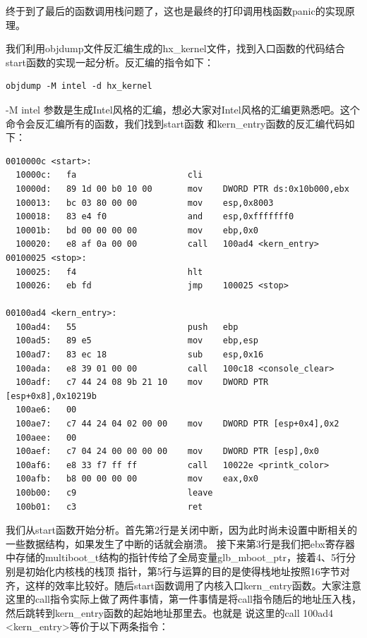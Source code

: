 \par 终于到了最后的函数调用栈问题了，这也是最终的打印调用栈函数panic的实现原理。

\par 我们利用objdump文件反汇编生成的hx\_kernel文件，找到入口函数的代码结合start函数的实现一起分析。反汇编的指令如下：

\begin{Verbatim}[frame=single]
  objdump -M intel -d hx_kernel
\end{Verbatim}

\par -M intel 参数是生成Intel风格的汇编，想必大家对Intel风格的汇编更熟悉吧。这个命令会反汇编所有的函数，我们找到start函数\allowbreak
和kern\_entry函数的反汇编代码如下：

\begin{lstlisting}[language = {[x86masm]Assembler}, label = 入口函数反汇编, caption = 入口函数反汇编]
0010000c <start>:
  10000c:	fa                   	cli    
  10000d:	89 1d 00 b0 10 00    	mov    DWORD PTR ds:0x10b000,ebx
  100013:	bc 03 80 00 00       	mov    esp,0x8003
  100018:	83 e4 f0             	and    esp,0xfffffff0
  10001b:	bd 00 00 00 00       	mov    ebp,0x0
  100020:	e8 af 0a 00 00       	call   100ad4 <kern_entry>
00100025 <stop>:
  100025:	f4                   	hlt    
  100026:	eb fd                	jmp    100025 <stop>

00100ad4 <kern_entry>:
  100ad4:	55                   	push   ebp
  100ad5:	89 e5                	mov    ebp,esp
  100ad7:	83 ec 18             	sub    esp,0x16
  100ada:	e8 39 01 00 00       	call   100c18 <console_clear>
  100adf:	c7 44 24 08 9b 21 10 	mov    DWORD PTR [esp+0x8],0x10219b
  100ae6:	00 
  100ae7:	c7 44 24 04 02 00 00 	mov    DWORD PTR [esp+0x4],0x2
  100aee:	00 
  100aef:	c7 04 24 00 00 00 00 	mov    DWORD PTR [esp],0x0
  100af6:	e8 33 f7 ff ff       	call   10022e <printk_color>
  100afb:	b8 00 00 00 00       	mov    eax,0x0
  100b00:	c9                   	leave  
  100b01:	c3                   	ret    
\end{lstlisting}

\par 我们从start函数开始分析。首先第2行是关闭中断，因为此时尚未设置中断相关的一些数据结构，如果发生了中断的话就会崩溃。\allowbreak
接下来第3行是我们把ebx寄存器中存储的multiboot\_t结构的指针传给了全局变量glb\_mboot\_ptr，接着4、5行分别是初始化内核栈的栈顶\allowbreak
指针，第5行与运算的目的是使得栈地址按照16字节对齐，这样的效率比较好。随后start函数调用了内核入口kern\_entry函数。大家注意\allowbreak
这里的call指令实际上做了两件事情，第一件事情是将call指令随后的地址压入栈，然后跳转到kern\_entry函数的起始地址那里去。也就是\allowbreak
说这里的call 100ad4 <kern\_entry>等价于以下两条指令：

